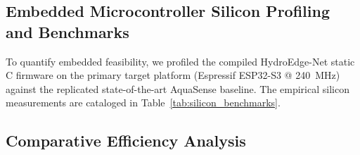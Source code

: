 \subsection{Embedded Microcontroller Silicon Profiling and Benchmarks}

To quantify embedded feasibility, we profiled the compiled HydroEdge-Net static C firmware on the primary target platform (Espressif ESP32-S3 @ 240~MHz) against the replicated state-of-the-art AquaSense baseline. The empirical silicon measurements are cataloged in Table~\ref{tab:silicon_benchmarks}.

\begin{table}[!t]
\caption{Silicon Resource Footprint and Microcontroller Profiling on Espressif ESP32-S3 (240~MHz)}
\label{tab:silicon_benchmarks}
\centering
\renewcommand{\arraystretch}{1.25}
\end{table}

\subsection{Comparative Efficiency Analysis}

